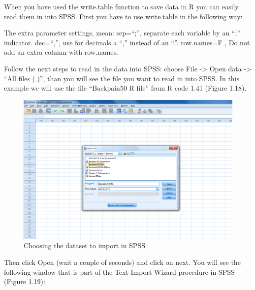 \documentclass[]{book}
\theoremstyle{definition}
\theoremstyle{definition}
\theoremstyle{definition}
\theoremstyle{remark}
\begin{document}
When you have used the write.table function to save data in R you can
easily read them in into SPSS. First you have to use write.table in the
following way:

The extra parameter settings, mean: sep=``;'', separate each variable by
an ``;'' indicator. dec=``,'', use for decimals a ``,'' instead of an
``.''. row.names=F , Do not add an extra column with row.names.

Follow the next steps to read in the data into SPSS: choose File
-\textgreater{} Open data -\textgreater{} ``All files (\emph{.})'', than
you will see the file you want to read in into SPSS. In this example we
will use the file ``Backpain50 R file'' from R code 1.41 (Figure 1.18).

\begin{figure}

{\centering \includegraphics[width=0.9\linewidth]{images/fig1.18} 

}

\caption{Choosing the dataset to import in SPSS}\label{fig:fig18}
\end{figure}

Then click Open (wait a couple of seconds) and click on next. You will
see the following window that is part of the Text Import Wizard
procedure in SPSS (Figure 1.19):
\end{document}
